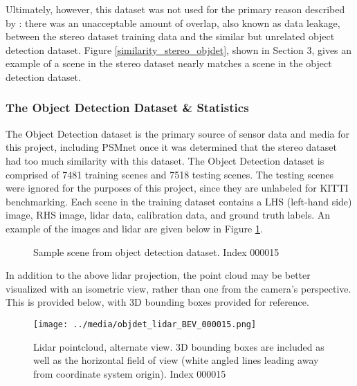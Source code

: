 Ultimately, however, this dataset was not used for the primary reason described by \cite{wang_pseudo-lidar_2019}: there was an unacceptable amount of overlap, also known as data leakage, between the stereo dataset training data and the similar but unrelated object detection dataset. Figure \ref{similarity_stereo_objdet}, shown in Section 3, gives an example of a scene in the stereo dataset nearly matches a scene in the object detection dataset.

\subsubsection{The Object Detection Dataset \& Statistics}
The Object Detection dataset is the primary source of sensor data and media for this project, including PSMnet once it was determined that the stereo dataset had too much similarity with this dataset. The Object Detection dataset is comprised of 7481 training scenes and 7518 testing scenes. The testing scenes were ignored for the purposes of this project, since they are unlabeled for KITTI benchmarking. Each scene in the training dataset contains a LHS (left-hand side) image, RHS image, lidar data, calibration data, and ground truth labels. An example of the images and lidar are given below in Figure \ref{objdet_sample}. 

\begin{figure}[H]
    \centering
    \caption{Sample scene from object detection dataset. Index 000015}
    \label{objdet_sample}
\end{figure}

In addition to the above lidar projection, the point cloud may be better visualized with an isometric view, rather than one from the camera's perspective. This is provided below, with 3D bounding boxes provided for reference.

\begin{figure}[H]
    \texttt{[image: ../media/objdet\_lidar\_BEV\_000015.png]}
    \caption{Lidar pointcloud, alternate view. 3D bounding boxes are included as well as the horizontal field of view (white angled lines leading away from coordinate system origin). Index 000015}
    \label{objdet_lidar_sample}
\end{figure}

